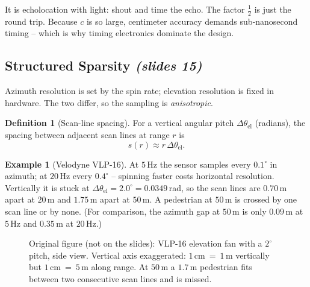 \documentclass[11pt,a4paper]{article}
\numberwithin{equation}{section}
\newcommand{\slides}[1]{\texorpdfstring{\;\emph{(slides #1)}}{ (slides #1)}}
\theoremstyle{plain}
\theoremstyle{definition}
\newtheorem{definition}[theorem]{Definition}
\newtheorem{example}[theorem]{Example}
\begin{document}
\begin{intuition}
It is echolocation with light: shout and time the echo. The factor $\tfrac12$ is just the round trip. Because $c$ is so large, centimeter accuracy demands sub-nanosecond timing -- which is why timing electronics dominate the design.
\end{intuition}
 
\subsection{Structured Sparsity \slides{15}}
 
Azimuth resolution is set by the spin rate; elevation resolution is fixed in hardware. The two differ, so the sampling is \emph{anisotropic}.
 
\begin{definition}[Scan-line spacing]
For a vertical angular pitch $\Delta\theta_{\text{el}}$ (radians), the spacing between adjacent scan lines at range $r$ is
\[
s(r)\approx r\,\Delta\theta_{\text{el}}.
\]
\end{definition}
 
\begin{example}[Velodyne VLP-16]
At $5$\,Hz the sensor samples every $0.1^\circ$ in azimuth; at $20$\,Hz every $0.4^\circ$ -- spinning faster costs horizontal resolution. Vertically it is stuck at $\Delta\theta_{\text{el}}=2.0^\circ=0.0349$\,rad, so the scan lines are $0.70$\,m apart at $20$\,m and $1.75$\,m apart at $50$\,m. A pedestrian at $50$\,m is crossed by one scan line or by none. (For comparison, the azimuth gap at $50$\,m is only $0.09$\,m at $5$\,Hz and $0.35$\,m at $20$\,Hz.)
\end{example}
 
\begin{figure}[htbp]
\centering
{}
\caption{Original figure (not on the slides): VLP-16 elevation fan with a $2^\circ$ pitch, side view. Vertical axis exaggerated: $1$\,cm~=~$1$\,m vertically but $1$\,cm~=~$5$\,m along range. At $50$\,m a $1.7$\,m pedestrian fits between two consecutive scan lines and is missed.}
\end{figure}
 
\end{document}
